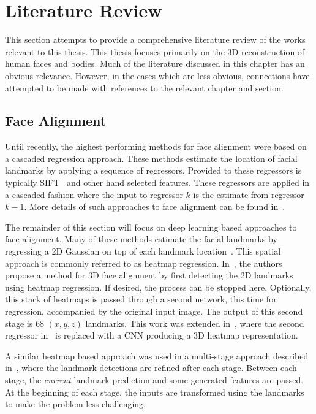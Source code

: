 \chapter{Literature Review}


This section attempts to provide a comprehensive literature review of
the works relevant to this thesis. This thesis focuses primarily on
the 3D reconstruction of human faces and bodies. Much of the
literature discussed in this chapter has an obvious
relevance. However, in the cases which are less obvious, connections
have attempted to be made with references to the relevant chapter and
section.

\section{Face Alignment}

Until recently, the highest performing methods for face alignment were
based on a cascaded regression approach. These methods estimate the
location of facial landmarks by applying a sequence of
regressors. Provided to these regressors is typically
SIFT~\cite{lowe2004distinctive} and other hand selected
features. These regressors are applied in a cascaded fashion where the
input to regressor $k$ is the estimate from regressor $k-1$. More
details of such approaches to face alignment can be found
in~\cite{sanchez16,cao2014facewarehouse,xiongsupervised,zhu2015face,tzimiropoulos2015project}.

The remainder of this section will focus on deep learning based
approaches to face alignment. Many of these methods estimate the
facial landmarks by regressing a 2D Gaussian on top of each landmark
location~\cite{bulat2016two,bulat2017far,mahpod2018facial,kowalski2017deep,merget2018robust}.
This spatial approach is commonly referred to as heatmap
regression. In~\cite{bulat2016two}, the authors propose a method for
3D face alignment by first detecting the 2D landmarks using heatmap
regression. If desired, the process can be stopped here. Optionally,
this stack of heatmaps is passed through a second network, this time
for regression, accompanied by the original input image. The output of
this second stage is 68 $(x, y, z)$ landmarks. This work was extended
in~\cite{bulat2017far}, where the second regressor
in~\cite{bulat2016two} is replaced with a CNN producing a 3D heatmap
representation.

A similar heatmap based approach was used in a multi-stage approach
described in~\cite{kowalski2017deep}, where the landmark detections
are refined after each stage. Between each stage, the \textit{current}
landmark prediction and some generated features are passed. At the
beginning of each stage, the inputs are transformed using the
landmarks to make the problem less challenging.

